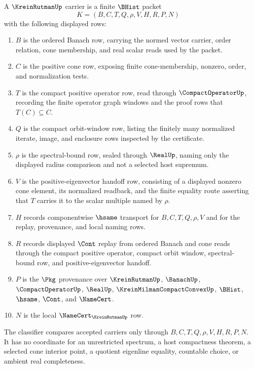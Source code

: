 \begin{definition}
\label{def:krein-rutman-carrier}
A $\KreinRutmanUp$ carrier is a finite $\BHist$ packet
$$
K=(B,C,T,Q,\rho,V,H,R,P,N)
$$
with the following displayed rows:
\begin{enumerate}
\item $B$ is the ordered Banach row, carrying the normed vector carrier, order relation, cone membership, and real scalar reads used by the packet.
\item $C$ is the positive cone row, exposing finite cone-membership, nonzero, order, and normalization tests.
\item $T$ is the compact positive operator row, read through $\CompactOperatorUp$, recording the finite operator graph windows and the proof rows that $T(C)\subseteq C$.
\item $Q$ is the compact orbit-window row, listing the finitely many normalized iterate, image, and enclosure rows inspected by the certificate.
\item $\rho$ is the spectral-bound row, sealed through $\RealUp$, naming only the displayed radius comparison and not a selected host supremum.
\item $V$ is the positive-eigenvector handoff row, consisting of a displayed nonzero cone element, its normalized readback, and the finite equality route asserting that $T$ carries it to the scalar multiple named by $\rho$.
\item $H$ records componentwise $\hsame$ transport for $B,C,T,Q,\rho,V$ and for the replay, provenance, and local naming rows.
\item $R$ records displayed $\Cont$ replay from ordered Banach and cone reads through the compact positive operator, compact orbit window, spectral-bound row, and positive-eigenvector handoff.
\item $P$ is the $\Pkg$ provenance over $\KreinRutmanUp$, $\BanachUp$, $\CompactOperatorUp$, $\RealUp$, $\KreinMilmanCompactConvexUp$, $\BHist$, $\hsame$, $\Cont$, and $\NameCert$.
\item $N$ is the local $\NameCert_{\KreinRutmanUp}$ row.
\end{enumerate}
The classifier compares accepted carriers only through $B,C,T,Q,\rho,V,H,R,P,N$. It has no coordinate for an unrestricted spectrum, a host compactness theorem, a selected cone interior point, a quotient eigenline equality, countable choice, or ambient real completeness.
\end{definition}

